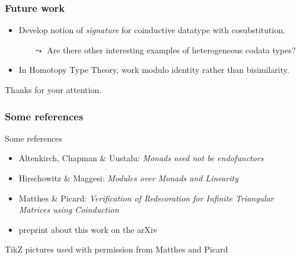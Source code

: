 \documentclass[
]
{beamer}
\newcommand{\constfont}[1]{\ensuremath{\mathsf{#1}}}
\newcommand{\M}{\constfont{M}}
\begin{document}
\begin{frame}
	\frametitle{Future work}
	
	\begin{itemize}\setlength{\itemsep}{1em}
	 \item Develop notion of \emph{signature} for coinductive datatype with cosubstitution.
	   \begin{itemize}
	      \item [$\leadsto$] Are there other interesting examples of heterogeneous codata types?
	   \end{itemize}
	 \item In Homotopy Type Theory, work modulo identity rather than bisimilarity.
	\end{itemize}

	

\vspace{1em}

   \pause \begin{center} Thanks for your attention. \end{center}
\end{frame}

\begin{frame}
 \frametitle{Some references}
 
  
  
  \begin{block}{Some references}
   \begin{itemize}
    \item Altenkirch, Chapman \& Uustalu: \emph{Monads need not be endofunctors}
    \item Hirschowitz \& Maggesi: \emph{Modules over Monads and Linearity}
    \item Matthes \& Picard: \emph{Verification of Redecoration for Infinite Triangular Matrices using Coinduction}
    \item preprint about this work on the arXiv
   \end{itemize}
  \end{block}

  TikZ pictures used with permission from Matthes and Picard
 
\end{frame}
\end{document}
